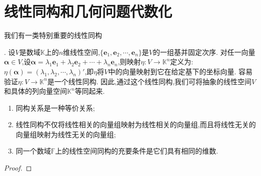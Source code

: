 \documentclass[../../main.tex]{subfiles}
\begin{document}
\section{线性同构和几何问题代数化}

\hypertarget{线性同构1}{我们有一类特别重要的线性同构}. 设\(V\)是数域\(\mathbb{K}\)上的\(n\)维线性空间,\(\{\boldsymbol{e}_1,\boldsymbol{e}_2,\cdots,\boldsymbol{e}_n\}\)是\(V\)的一组基并固定次序. 对任一向量\(\boldsymbol{\alpha}\in V\),设\(\boldsymbol{\alpha}=\lambda_1\boldsymbol{e}_1+\lambda_2\boldsymbol{e}_2+\cdots+\lambda_n\boldsymbol{e}_n\),则映射\(\eta:V\to\mathbb{K}^n\)定义为:\(\eta(\boldsymbol{\alpha})=(\lambda_1,\lambda_2,\cdots,\lambda_n)'\),即\(\eta\)将\(V\)中的向量映射到它在给定基下的坐标向量. 容易验证\(\eta:V\to\mathbb{K}^n\)是一个线性同构. 因此,通过这个线性同构,我们可将抽象的线性空间\(V\)和具体的列向量空间\(\mathbb{K}^n\)等同起来.

\begin{theorem}\label{theorem:线性空间的同构}
\begin{enumerate}[(1)]
\item 同构关系是一种等价关系;
\item 线性同构不仅将线性相关的向量组映射为线性相关的向量组,而且将线性无关的向量组映射为线性无关的向量组;
\item 同一个数域\(\mathbb{F}\)上的线性空间同构的充要条件是它们具有相同的维数.
\end{enumerate}
\end{theorem}
\begin{proof}

\end{proof}
\end{document}
